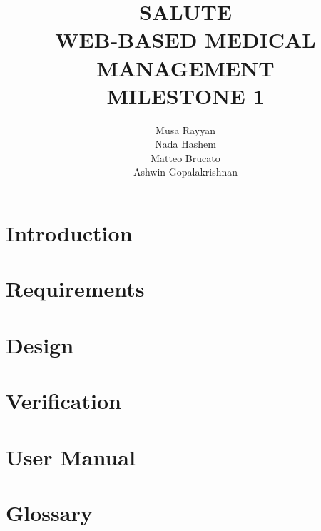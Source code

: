 \documentclass[10pt]{report}
\title{SALUTE \\ WEB-BASED MEDICAL MANAGEMENT \\ MILESTONE 1}
\author{Musa Rayyan \\ Nada Hashem \\ Matteo Brucato \\ Ashwin Gopalakrishnan}
\begin{document}
\maketitle
\tableofcontents

\part{Introduction}


\part{Requirements}


\part{Design}


\part{Verification}


\part{User Manual}


\part{Glossary}


\appendix

\end{document}
